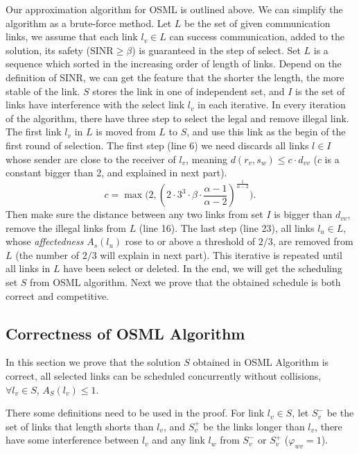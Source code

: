 \documentclass[conference]{IEEEtran}
\begin{document}
Our approximation algorithm for OSML is outlined above. We can simplify the algorithm as a brute-force method. Let $L$ be the set of given communication links, we assume that each link $l_v\in L$ can success communication, added to the solution, its safety ($\textrm{SINR} \geq \beta$) is guaranteed in the step of select. Set $L$ is a sequence which sorted in the increasing order of length of links. Depend on the definition of SINR, we can get the feature that the shorter the length, the more stable of the link. $S$ stores the link in one of independent set, and $I$ is the set of links have interference with the select link $l_v$ in each iterative. In every iteration of the algorithm, there have three step to select the legal and remove illegal link. The first link $l_v$ in $L$ is moved from $L$ to $S$, and use this link as the begin of the first round of selection. The first step (line 6) we need discards all links $l \in I$ whose sender are close to the receiver of $l_v$, meaning $d(r_v,s_w) \leq c \cdot d_{vv}$ ($c$ is a constant bigger than 2, and explained in next part).
\begin{equation}\label{value of c}
c=\max{  \bigg( 2,(2 \cdot 3^3 \cdot \beta \cdot \frac{\alpha-1}{\alpha-2})^{\frac{1}{\alpha-2}}\bigg)}.
\end{equation}
Then make sure the distance between any two links from set $I$ is bigger than $d_{vv}$, remove the illegal links from $L$ (line 16). The last step (line 23), all links $l_u \in L$, whose \emph{affectedness} $A_s(l_u)$ rose to or above a threshold of $2/3$, are removed from $L$ (the number of $2/3$ will explain in next part). This iterative is repeated until all links in $L$ have been select or deleted. In the end, we will get the scheduling set $S$ from OSML algorithm. Next we prove that the obtained schedule is both correct and competitive.



\subsection{Correctness of OSML Algorithm}
In this section we prove that the solution $S$ obtained in OSML Algorithm is correct, all selected links can be scheduled concurrently without collisions, $\forall l_v \in S$, $A_S(l_v) \leq 1$.

There some definitions need to be used in the proof. For link $l_v \in S$, let $S^-_v$ be the set of links that length shorts than $l_v$, and  $S^+_v$ be the links longer than $l_v$, there have some interference between $l_v$ and any link $l_w$ from $S^-_v$ or $S^+_v$ ($\varphi_{wv}=1$).
\end{document}

